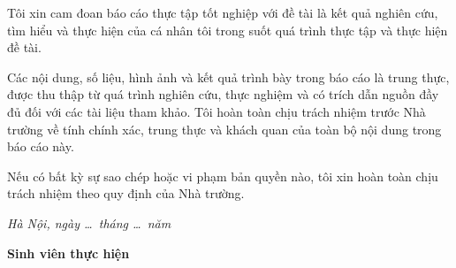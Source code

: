 
Tôi xin cam đoan báo cáo thực tập tốt nghiệp với đề tài \textbf{\TenBaoCao} là kết quả nghiên cứu, tìm hiểu và thực hiện của cá nhân tôi trong suốt quá trình thực tập và thực hiện đề tài.

Các nội dung, số liệu, hình ảnh và kết quả trình bày trong báo cáo là trung thực, được thu thập từ quá trình nghiên cứu, thực nghiệm và có trích dẫn nguồn đầy đủ đối với các tài liệu tham khảo. Tôi hoàn toàn chịu trách nhiệm trước Nhà trường về tính chính xác, trung thực và khách quan của toàn bộ nội dung trong báo cáo này.

Nếu có bất kỳ sự sao chép hoặc vi phạm bản quyền nào, tôi xin hoàn toàn chịu trách nhiệm theo quy định của Nhà trường.

\vspace{1cm}

\begin{flushright}
\begin{minipage}{8cm}
\centering

\textit{Hà Nội, ngày \ldots\ tháng \ldots\ năm \Nam}

\vspace{0.7cm}

\textbf{Sinh viên thực hiện}

\vspace{2.5cm}

\textbf{\TenSinhVien}

\end{minipage}
\end{flushright}